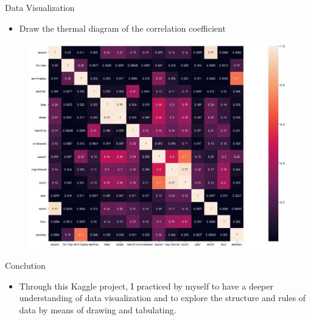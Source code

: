 \documentclass[
 size=14pt,
 paper=smartboard,  %
 mode=present, 		%
 display=slides, 	%
 style=tuliplab,  	%
 pauseslide,
 fleqn,leqno]{powerdot}
\begin{document}
\begin{slide}[toc=,bm=]{Data  Visualization}
  \begin{center}

    {
      \begin{itemize}
        
          \item Draw the thermal diagram of the correlation coefficient
      \end{itemize} 
        \begin{figure}
          \centering
          \includegraphics[height=0.5\textwidth]{pic/hot (1).eps}
          \centering
        \end{figure} 
    }
    \end{center}
 


\end{slide}
\begin{slide}[toc=,bm=]{Conclution}
  \begin{center}

    {
      \begin{itemize}
        
          \item Through this Kaggle project, I practiced by myself to have a deeper understanding of data visualization and to explore the structure and rules of data by means of drawing and tabulating.

      \end{itemize} 
        
    }
    \end{center}
 


\end{slide}
\end{document}
